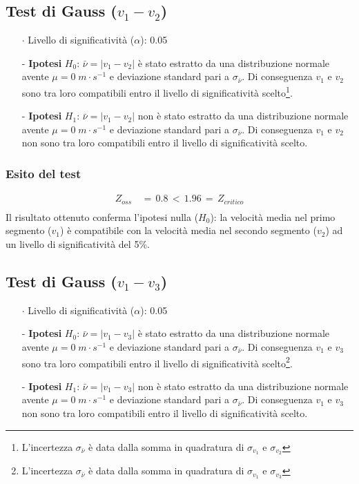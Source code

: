 \documentclass{article}
\begin{document}
\subsection{Test di Gauss ($v_1 - v_2$)}
\begin{itemize}
    \item [$\cdot$] Livello di significatività ($\alpha$): 0.05
    \item [-] \textbf{Ipotesi} $H_0$: $\bar{\nu} = |v_1 - v_2|$ è stato estratto da una distribuzione normale avente $\mu = 0\;m\cdot s^{-1}$ e deviazione standard pari a $\sigma_{\bar{\nu}}$. Di conseguenza $v_1$ e $v_2$ sono tra loro compatibili entro il livello di significatività scelto\footnote{L'incertezza $\sigma_{\bar{\nu}}$ è data dalla somma in quadratura di $\sigma_{v_1}$ e $\sigma_{v_2}$}.
    \item [-] \textbf{Ipotesi} $H_1$: $\bar{\nu} = |v_1 - v_2|$ non è stato estratto da una distribuzione normale avente $\mu = 0\;m\cdot s^{-1}$ e deviazione standard pari a $\sigma_{\bar{\nu}}$. Di conseguenza $v_1$ e $v_2$ non sono tra loro compatibili entro il livello di significatività scelto.
\end{itemize}
\subsubsection{Esito del test}
\begin{equation*}
\begin{split}
    Z_{oss} \,&= \,0.8 \,< \,1.96 \,= \,Z_{critico} \\[0.2cm]
\end{split}
\end{equation*}
Il risultato ottenuto conferma l'ipotesi nulla ($H_0$): la velocità media nel primo segmento ($v_1$) è compatibile con la velocità media nel secondo segmento ($v_2$) ad un livello di significatività del 5\%.
\vspace{0.3cm}

\subsection{Test di Gauss ($v_1 - v_3$)}
\begin{itemize}
    \item [$\cdot$] Livello di significatività ($\alpha$): 0.05
    \item [-] \textbf{Ipotesi} $H_0$: $\bar{\nu} = |v_1 - v_3|$ è stato estratto da una distribuzione normale avente $\mu = 0\;m\cdot s^{-1}$ e deviazione standard pari a $\sigma_{\bar{\nu}}$. Di conseguenza $v_1$ e $v_3$ sono tra loro compatibili entro il livello di significatività scelto\footnote{L'incertezza $\sigma_{\bar{\nu}}$ è data dalla somma in quadratura di $\sigma_{v_1}$ e $\sigma_{v_3}$}.
    \item [-] \textbf{Ipotesi} $H_1$: $\bar{\nu} = |v_1 - v_3|$ non è stato estratto da una distribuzione normale avente $\mu = 0\;m\cdot s^{-1}$ e deviazione standard pari a $\sigma_{\bar{\nu}}$. Di conseguenza $v_1$ e $v_3$ non sono tra loro compatibili entro il livello di significatività scelto.
\end{itemize}
\end{document}
